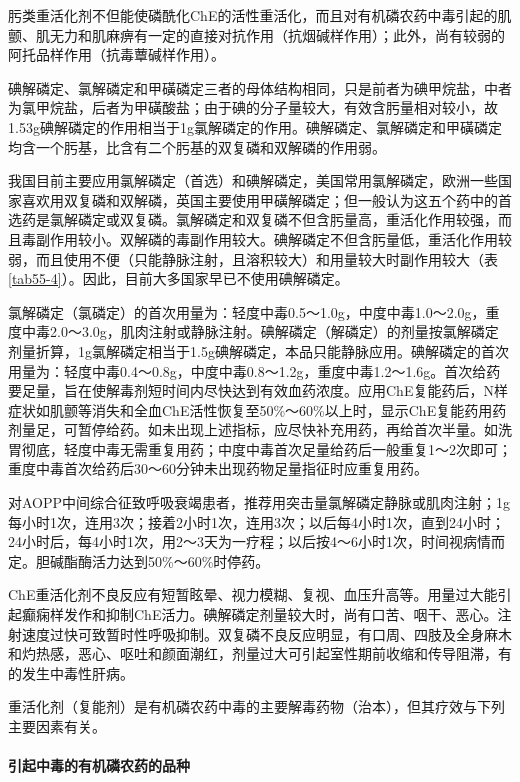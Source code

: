 肟类重活化剂不但能使磷酰化ChE的活性重活化，而且对有机磷农药中毒引起的肌颤、肌无力和肌麻痹有一定的直接对抗作用（抗烟碱样作用）；此外，尚有较弱的阿托品样作用（抗毒蕈碱样作用）。

碘解磷定、氯解磷定和甲磺磷定三者的母体结构相同，只是前者为碘甲烷盐，中者为氯甲烷盐，后者为甲磺酸盐；由于碘的分子量较大，有效含肟量相对较小，故1.53g碘解磷定的作用相当于1g氯解磷定的作用。碘解磷定、氯解磷定和甲磺磷定均含一个肟基，比含有二个肟基的双复磷和双解磷的作用弱。

我国目前主要应用氯解磷定（首选）和碘解磷定，美国常用氯解磷定，欧洲一些国家喜欢用双复磷和双解磷，英国主要使用甲磺解磷定；但一般认为这五个药中的首选药是氯解磷定或双复磷。氯解磷定和双复磷不但含肟量高，重活化作用较强，而且毒副作用较小。双解磷的毒副作用较大。碘解磷定不但含肟量低，重活化作用较弱，而且使用不便（只能静脉注射，且溶积较大）和用量较大时副作用较大（表\ref{tab55-4}）。因此，目前大多国家早已不使用碘解磷定。

氯解磷定（氯磷定）的首次用量为：轻度中毒0.5～1.0g，中度中毒1.0～2.0g，重度中毒2.0～3.0g，肌肉注射或静脉注射。碘解磷定（解磷定）的剂量按氯解磷定剂量折算，1g氯解磷定相当于1.5g碘解磷定，本品只能静脉应用。碘解磷定的首次用量为：轻度中毒0.4～0.8g，中度中毒0.8～1.2g，重度中毒1.2～1.6g。首次给药要足量，旨在使解毒剂短时间内尽快达到有效血药浓度。应用ChE复能药后，N样症状如肌颤等消失和全血ChE活性恢复至50\%～60\%以上时，显示ChE复能药用药剂量足，可暂停给药。如未出现上述指标，应尽快补充用药，再给首次半量。如洗胃彻底，轻度中毒无需重复用药；中度中毒首次足量给药后一般重复1～2次即可；重度中毒首次给药后30～60分钟未出现药物足量指征时应重复用药。

对AOPP中间综合征致呼吸衰竭患者，推荐用突击量氯解磷定静脉或肌肉注射；1g每小时1次，连用3次；接着2小时1次，连用3次；以后每4小时1次，直到24小时；24小时后，每4小时1次，用2～3天为一疗程；以后按4～6小时1次，时间视病情而定。胆碱酯酶活力达到50\%～60\%时停药。

ChE重活化剂不良反应有短暂眩晕、视力模糊、复视、血压升高等。用量过大能引起癫痫样发作和抑制ChE活力。碘解磷定剂量较大时，尚有口苦、咽干、恶心。注射速度过快可致暂时性呼吸抑制。双复磷不良反应明显，有口周、四肢及全身麻木和灼热感，恶心、呕吐和颜面潮红，剂量过大可引起室性期前收缩和传导阻滞，有的发生中毒性肝病。

重活化剂（复能剂）是有机磷农药中毒的主要解毒药物（治本），但其疗效与下列主要因素有关。

\paragraph{引起中毒的有机磷农药的品种}

